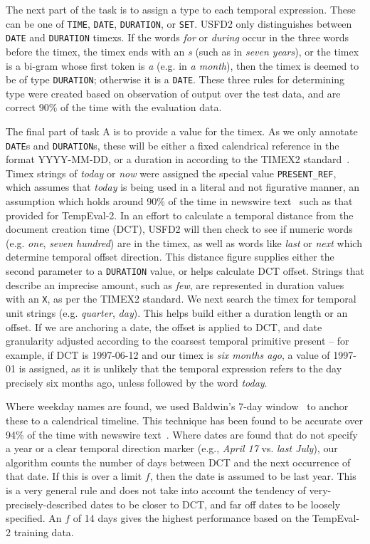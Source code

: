 \documentclass[11pt]{article}
\begin{document}
The next part of the task is to assign a type to each temporal expression. These can be one of {\tt TIME}, {\tt DATE}, {\tt DURATION}, or {\tt SET}. USFD2 only distinguishes between {\tt DATE} and {\tt DURATION} timexs. If the words \emph{for} or \emph{during} occur in the three words before the timex, the timex ends with an {\emph s} (such as in \emph{seven years}), or the timex is a bi-gram whose first token is {\emph a} (e.g. in \emph{a month}), then the timex is deemed to be of type {\tt DURATION}; otherwise it is a {\tt DATE}. These three rules for determining type were created based on observation of output over the test data, and are correct 90\% of the time with the evaluation data.

The final part of task A is to provide a value for the timex. As we only annotate {\tt DATE}s and {\tt DURATION}s, these will be either a fixed calendrical reference in the format YYYY-MM-DD, or a duration in according to the TIMEX2 standard~\cite{ferro2005tides}. Timex strings of \emph{today} or \emph{now} were assigned the special value {\tt PRESENT\_REF}, which assumes that \emph{today} is being used in a literal and not figurative manner, an assumption which holds around 90\% of the time in newswire text~\cite{ahn2005towards} such as that provided for TempEval-2. In an effort to calculate a temporal distance from the document creation time (DCT), USFD2 will then check to see if numeric words (e.g. \emph{one}, \emph{seven hundred}) are in the timex, as well as words like \emph{last} or \emph{next} which determine temporal offset direction. This distance figure supplies either the second parameter to a {\tt DURATION} value, or helps calculate DCT offset. Strings that describe an imprecise amount, such as \emph{few}, are represented in duration values with an {\tt X}, as per the TIMEX2 standard. We next search the timex for temporal unit strings (e.g. \emph{quarter}, \emph{day}). This helps build either a duration length or an offset. If we are anchoring a date, the offset is applied to DCT, and date granularity adjusted according to the coarsest temporal primitive present -- for example, if DCT is 1997-06-12 and our timex is \emph{six months ago}, a value of 1997-01 is assigned, as it is unlikely that the temporal expression refers to the day precisely six months ago, unless followed by the word \emph{today}.

Where weekday names are found, we used Baldwin's 7-day window~\cite{baldwin2002learning} to anchor these to a calendrical timeline. This technique has been found to be accurate over 94\% of the time with newswire text~\cite{mazur2008s}. Where dates are found that do not specify a year or a clear temporal direction marker (e.g., \emph{April 17} vs. \emph{last July}), our algorithm counts the number of days between DCT and the next occurrence of that date. If this is over a limit $f$, then the date is assumed to be last year. This is a very general rule and does not take into account the tendency of very-precisely-described dates to be closer to DCT, and far off dates to be loosely specified. An $f$ of 14 days gives the highest performance based on the TempEval-2 training data.
\end{document}

